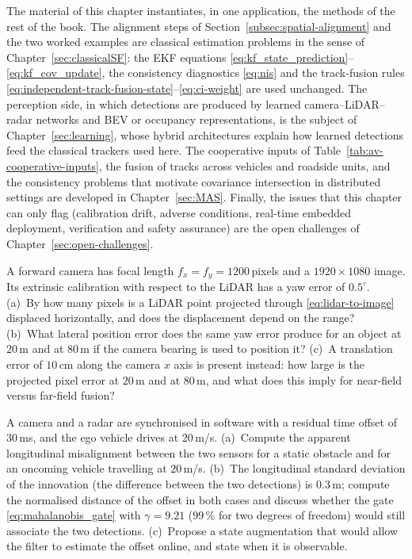 The material of this chapter instantiates, in one application, the methods of the rest of the book. The alignment steps of Section~\ref{subsec:spatial-alignment} and the two worked examples are classical estimation problems in the sense of Chapter~\ref{sec:classicalSF}: the EKF equations \eqref{eq:kf_state_prediction}--\eqref{eq:kf_cov_update}, the consistency diagnostics \eqref{eq:nis} and the track-fusion rules \eqref{eq:independent-track-fusion-state}--\eqref{eq:ci-weight} are used unchanged. The perception side, in which detections are produced by learned camera--LiDAR--radar networks and BEV or occupancy representations, is the subject of Chapter~\ref{sec:learning}, whose hybrid architectures explain how learned detections feed the classical trackers used here. The cooperative inputs of Table~\ref{tab:av-cooperative-inputs}, the fusion of tracks across vehicles and roadside units, and the consistency problems that motivate covariance intersection in distributed settings are developed in Chapter~\ref{sec:MAS}. Finally, the issues that this chapter can only flag (calibration drift, adverse conditions, real-time embedded deployment, verification and safety assurance) are the open challenges of Chapter~\ref{sec:open-challenges}.

\problemsection

\begin{prob}\label{prob:ch05:1}
A forward camera has focal length $f_{x}=f_{y}=1200$\,pixels and a $1920\times1080$ image. Its extrinsic calibration with respect to the LiDAR has a yaw error of $0.5^{\circ}$. (a)~By how many pixels is a LiDAR point projected through \eqref{eq:lidar-to-image} displaced horizontally, and does the displacement depend on the range? (b)~What lateral position error does the same yaw error produce for an object at $20$\,m and at $80$\,m if the camera bearing is used to position it? (c)~A translation error of $10$\,cm along the camera $x$ axis is present instead: how large is the projected pixel error at $20$\,m and at $80$\,m, and what does this imply for near-field versus far-field fusion?
\end{prob}

\begin{prob}\label{prob:ch05:2}
A camera and a radar are synchronised in software with a residual time offset of $30$\,ms, and the ego vehicle drives at $20$\,m/s. (a)~Compute the apparent longitudinal misalignment between the two sensors for a static obstacle and for an oncoming vehicle travelling at $20$\,m/s. (b)~The longitudinal standard deviation of the innovation (the difference between the two detections) is $0.3$\,m; compute the normalised distance of the offset in both cases and discuss whether the gate \eqref{eq:mahalanobis_gate} with $\gamma=9.21$ ($99$\,\% for two degrees of freedom) would still associate the two detections. (c)~Propose a state augmentation that would allow the filter to estimate the offset online, and state when it is observable.
\end{prob}

